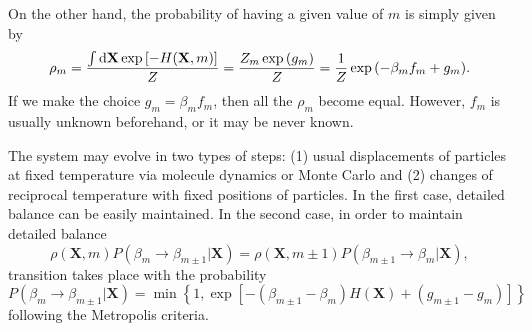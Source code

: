 On the other hand, the probability of having a given value of $m$ is simply given by
\begin{equation}
    \rho_m=\frac{\int\mathop{}\!\mathrm{d} \mathbf{X} \exp{\left[-H(\mathbf{X},m)\right]}}{Z}=\frac{Z_m\exp{(g_m)}}{Z}=\frac{1}{Z}\exp{(-\beta_m f_m+g_m)}.
\end{equation}
If we make the choice $g_m=\beta_m f_m$, then all the $\rho_m$ become equal. However, $f_m$ is usually unknown beforehand, or it may be never known.

The system may evolve in two types of steps: (1) usual displacements of particles at fixed temperature via molecule dynamics or Monte Carlo and (2) changes of reciprocal temperature with fixed positions of particles. In the first case, detailed balance can be easily maintained. In the second case, in order to maintain detailed balance
\begin{equation}
    \rho(\mathbf{X},m)P(\beta_m\to \beta_{m\pm 1}|\mathbf{X})=\rho(\mathbf{X},m\pm 1)P(\beta_{m\pm 1}\to \beta_{m}|\mathbf{X}),
\end{equation}
transition takes place with the probability
\begin{equation}
    P(\beta_m\to \beta_{m\pm 1}|\mathbf{X})=\min{\left\{1,\exp{\left[-(\beta_{m\pm1}-\beta_m)H(\mathbf{X})+(g_{m\pm1}-g_m)\right]}\right\}}
\end{equation}
following the Metropolis criteria.